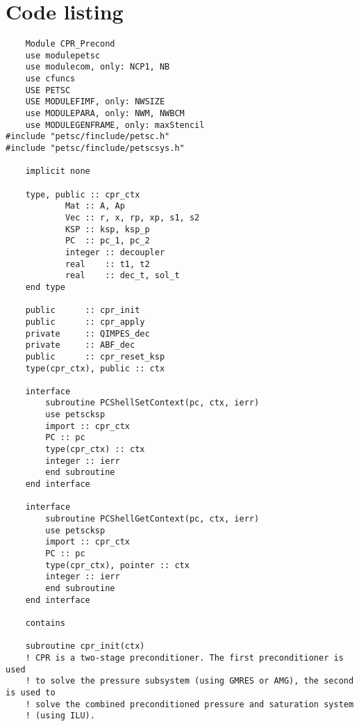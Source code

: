 

\chapter{Code listing}


\begin{lstlisting}
    Module CPR_Precond 
    use modulepetsc
    use modulecom, only: NCP1, NB
    use cfuncs
    USE PETSC
    USE MODULEFIMF, only: NWSIZE
    use MODULEPARA, only: NWM, NWBCM
    use MODULEGENFRAME, only: maxStencil
#include "petsc/finclude/petsc.h"
#include "petsc/finclude/petscsys.h"

    implicit none
    
    type, public :: cpr_ctx
            Mat :: A, Ap 
            Vec :: r, x, rp, xp, s1, s2
            KSP :: ksp, ksp_p
            PC  :: pc_1, pc_2
            integer :: decoupler
            real    :: t1, t2
            real    :: dec_t, sol_t
    end type
    
    public      :: cpr_init
    public      :: cpr_apply
    private     :: QIMPES_dec
    private     :: ABF_dec
    public      :: cpr_reset_ksp 
    type(cpr_ctx), public :: ctx

    interface
        subroutine PCShellSetContext(pc, ctx, ierr)
        use petscksp
        import :: cpr_ctx
        PC :: pc
        type(cpr_ctx) :: ctx
        integer :: ierr
        end subroutine
    end interface

    interface
        subroutine PCShellGetContext(pc, ctx, ierr)
        use petscksp
        import :: cpr_ctx
        PC :: pc
        type(cpr_ctx), pointer :: ctx
        integer :: ierr
        end subroutine
    end interface

    contains

    subroutine cpr_init(ctx)
    ! CPR is a two-stage preconditioner. The first preconditioner is used
    ! to solve the pressure subsystem (using GMRES or AMG), the second is used to 
    ! solve the combined preconditioned pressure and saturation system 
    ! (using ILU).


\end{lstlisting}
